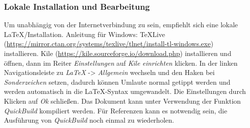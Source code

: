 \documentclass[../main.tex]{subfiles}
\begin{document}
\subsubsection{Lokale Installation und Bearbeitung}
Um unabh\"angig von der Internetverbindung zu sein, empfiehlt sich eine lokale \LaTeX\-/Installation. Anleitung f\"ur Windows: TeXLive (\url{https://mirror.ctan.org/systems/texlive/tlnet/install-tl-windows.exe}) installieren. Kile (\url{https://kile.sourceforge.io/download.php}) installieren und \"offnen, dann im Reiter \textit{Einstellungen} auf \textit{Kile einrichten} klicken. In der linken Navigationsleiste zu \textit{LaTeX} -> \textit{Allgemein} wechseln und den Haken bei \textit{Sonderzeichen} setzen, dadurch k\"onnen Umlaute normal getippt werden und werden automatisch in die \LaTeX-Syntax umgewandelt. Die Einstellungen durch Klicken auf \textit{Ok} schlie\ss{}en. Das Dokument kann unter Verwendung der Funktion \textit{QuickBuild} kompiliert werden. F\"ur Referenzen kann es notwendig sein, die Ausf\"uhrung von \textit{QuickBuild} noch einmal zu wiederholen.
\end{document}
